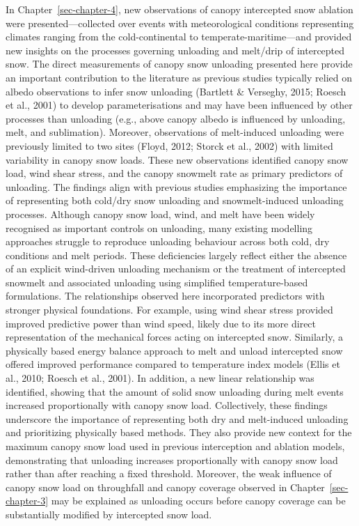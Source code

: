 \documentclass[
  letterpaper,
]{tex/uofsthesis-cs}
\begin{document}
In Chapter~\ref{sec-chapter-4}, new observations of canopy intercepted
snow ablation were presented---collected over events with meteorological
conditions representing climates ranging from the cold-continental to
temperate-maritime---and provided new insights on the processes
governing unloading and melt/drip of intercepted snow. The direct
measurements of canopy snow unloading presented here provide an
important contribution to the literature as previous studies typically
relied on albedo observations to infer snow unloading (Bartlett \&
Verseghy, 2015; Roesch et al., 2001) to develop parameterisations and
may have been influenced by other processes than unloading (e.g., above
canopy albedo is influenced by unloading, melt, and sublimation).
Moreover, observations of melt-induced unloading were previously limited
to two sites (Floyd, 2012; Storck et al., 2002) with limited variability
in canopy snow loads. These new observations identified canopy snow
load, wind shear stress, and the canopy snowmelt rate as primary
predictors of unloading. The findings align with previous studies
emphasizing the importance of representing both cold/dry snow unloading
and snowmelt-induced unloading processes. Although canopy snow load,
wind, and melt have been widely recognised as important controls on
unloading, many existing modelling approaches struggle to reproduce
unloading behaviour across both cold, dry conditions and melt periods.
These deficiencies largely reflect either the absence of an explicit
wind-driven unloading mechanism or the treatment of intercepted snowmelt
and associated unloading using simplified temperature-based
formulations. The relationships observed here incorporated predictors
with stronger physical foundations. For example, using wind shear stress
provided improved predictive power than wind speed, likely due to its
more direct representation of the mechanical forces acting on
intercepted snow. Similarly, a physically based energy balance approach
to melt and unload intercepted snow offered improved performance
compared to temperature index models (Ellis et al., 2010; Roesch et al.,
2001). In addition, a new linear relationship was identified, showing
that the amount of solid snow unloading during melt events increased
proportionally with canopy snow load. Collectively, these findings
underscore the importance of representing both dry and melt-induced
unloading and prioritizing physically based methods. They also provide
new context for the maximum canopy snow load used in previous
interception and ablation models, demonstrating that unloading increases
proportionally with canopy snow load rather than after reaching a fixed
threshold. Moreover, the weak influence of canopy snow load on
throughfall and canopy coverage observed in Chapter~\ref{sec-chapter-3}
may be explained as unloading occurs before canopy coverage can be
substantially modified by intercepted snow load.
\end{document}
